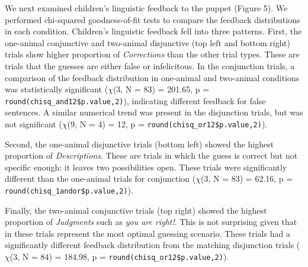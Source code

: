 \documentclass[10pt, letterpaper]{article}
\begin{document}
We next examined children's linguistic feedback to the puppet (Figure
5). We performed chi-squared goodness-of-fit tests to compare the
feedback distributions in each condition. Children's linguistic feedback
fell into three patterns. First, the one-animal conjunctive and
two-animal disjunctive (top left and bottom right) trials show higher
proportion of \emph{Corrections} than the other trial types. These are
trials that the guesses are either false or infelicitous. In the
conjunction trials, a comparison of the feedback distribution in
one-animal and two-animal conditions was statistically significant
(\(\chi\)(3, N = 83) = 201.65, p =
\texttt{round(chisq\_and12\$p.value,2)}), indicating different feedback
for false sentences. A similar numerical trend was present in the
disjunction trials, but was not significant (\(\chi\)(9, N = 4) = 12, p
= \texttt{round(chisq\_or12\$p.value,2)}).

Second, the one-animal disjunctive trials (bottom left) showed the
highest proportion of \emph{Descriptions}. These are trials in which the
guess is correct but not specific enough: it leaves two possibilities
open. These trials were significantly different than the one-animal
trials for conjunction (\(\chi\)(3, N = 83) = 62.16, p =
\texttt{round(chisq\_1andor\$p.value,2)}).

Finally, the two-animal conjunctive trials (top right) showed the
highest proportion of \emph{Judgments} such as \emph{you are right!}.
This is not surprising given that in these trials represent the most
optimal guessing scenario. These trials had a significantly different
feedback distribution from the matching disjunction trials (\(\chi\)(3,
N = 84) = 184.98, p = \texttt{round(chisq\_or12\$p.value,2)}).
\end{document}
